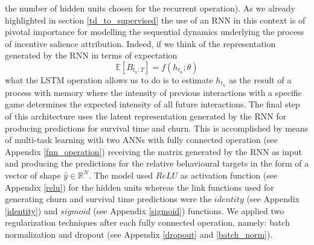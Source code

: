 the number of hidden units chosen for the recurrent operation). As we already highlighted in section \ref{td_to_supervised} the use of an RNN in this context is of pivotal importance for modelling the sequential dynamics underlying the process of incentive salience attribution. Indeed, if we think of the representation generated by the RNN in terms of expectation
\begin{equation}
\label{rnn_1_exp}
   \mathbb{E}[B_{t_n : T}] = f(h_{t_n}; \theta)
\end{equation}
what the LSTM operation allows us to do is to estimate $h_{t_n}$ as the result of a process with memory where the intensity of previous interactions with a specific game determines the expected intensity of all future interactions. The final step of this architecture uses the latent representation generated by the RNN for producing predictions for survival time and churn. This is accomplished by means of multi-task learning with two ANNs with fully connected operation (see Appendix \ref{fnn_operation}) receiving the matrix generated by the RNN as input and producing the predictions for the relative behavioural targets in the form of a vector of shape $\hat{y} \in \mathbb{R}^{N}$. The model used $ReLU$ as activation function (see Appendix \ref{relu}) for the hidden units whereas the link functions used for generating churn and survival time predictions were the $identity$ (see Appendix \ref{identity}) and $sigmoid$ (see Appendix \ref{sigmoid}) functions. We applied two regularization techniques after each fully connected operation, namely: batch normalization \cite{ioffe2015batch} and dropout \cite{srivastava2014dropout} (see Appendix \ref{dropout} and \ref{batch_norm}).


